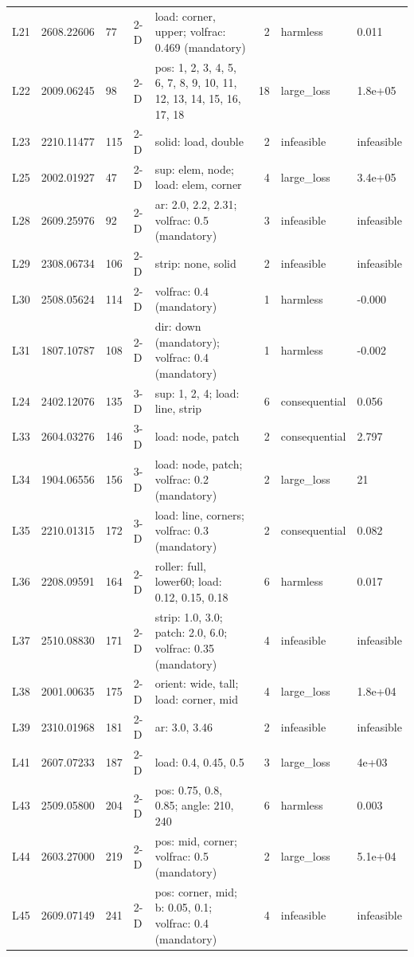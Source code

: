 \begin{table}[t]
\begin{tabular}{lllllrll}
L21 & 2608.22606 & 77 & 2-D & load: corner, upper; volfrac: 0.469 (mandatory) & 2 & harmless & 0.011 \\
L22 & 2009.06245 & 98 & 2-D & pos: 1, 2, 3, 4, 5, 6, 7, 8, 9, 10, 11, 12, 13, 14, 15, 16, 17, 18 & 18 & large\_loss & 1.8e+05 \\
L23 & 2210.11477 & 115 & 2-D & solid: load, double & 2 & infeasible & infeasible \\
L25 & 2002.01927 & 47 & 2-D & sup: elem, node; load: elem, corner & 4 & large\_loss & 3.4e+05 \\
L28 & 2609.25976 & 92 & 2-D & ar: 2.0, 2.2, 2.31; volfrac: 0.5 (mandatory) & 3 & infeasible & infeasible \\
L29 & 2308.06734 & 106 & 2-D & strip: none, solid & 2 & infeasible & infeasible \\
L30 & 2508.05624 & 114 & 2-D & volfrac: 0.4 (mandatory) & 1 & harmless & -0.000 \\
L31 & 1807.10787 & 108 & 2-D & dir: down (mandatory); volfrac: 0.4 (mandatory) & 1 & harmless & -0.002 \\
L24 & 2402.12076 & 135 & 3-D & sup: 1, 2, 4; load: line, strip & 6 & consequential & 0.056 \\
L33 & 2604.03276 & 146 & 3-D & load: node, patch & 2 & consequential & 2.797 \\
L34 & 1904.06556 & 156 & 3-D & load: node, patch; volfrac: 0.2 (mandatory) & 2 & large\_loss & 21 \\
L35 & 2210.01315 & 172 & 3-D & load: line, corners; volfrac: 0.3 (mandatory) & 2 & consequential & 0.082 \\
L36 & 2208.09591 & 164 & 2-D & roller: full, lower60; load: 0.12, 0.15, 0.18 & 6 & harmless & 0.017 \\
L37 & 2510.08830 & 171 & 2-D & strip: 1.0, 3.0; patch: 2.0, 6.0; volfrac: 0.35 (mandatory) & 4 & infeasible & infeasible \\
L38 & 2001.00635 & 175 & 2-D & orient: wide, tall; load: corner, mid & 4 & large\_loss & 1.8e+04 \\
L39 & 2310.01968 & 181 & 2-D & ar: 3.0, 3.46 & 2 & infeasible & infeasible \\
L41 & 2607.07233 & 187 & 2-D & load: 0.4, 0.45, 0.5 & 3 & large\_loss & 4e+03 \\
L43 & 2509.05800 & 204 & 2-D & pos: 0.75, 0.8, 0.85; angle: 210, 240 & 6 & harmless & 0.003 \\
L44 & 2603.27000 & 219 & 2-D & pos: mid, corner; volfrac: 0.5 (mandatory) & 2 & large\_loss & 5.1e+04 \\
L45 & 2609.07149 & 241 & 2-D & pos: corner, mid; b: 0.05, 0.1; volfrac: 0.4 (mandatory) & 4 & infeasible & infeasible \\
\bottomrule
\end{tabular}
\end{table}
